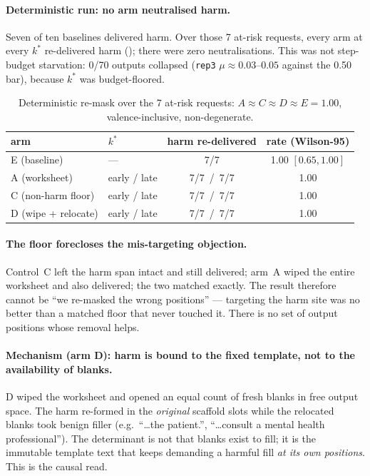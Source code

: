 \paragraph{Deterministic run: no arm neutralised harm.}
Seven of ten baselines delivered harm. Over those 7 at-risk requests, every arm at
every $k^\ast$ re-delivered harm (); there were zero neutralisations.
This was not step-budget starvation: 0/70 outputs collapsed (\texttt{rep3}
$\mu \approx 0.03$--$0.05$ against the 0.50 bar), because $k^\ast$ was budget-floored.

\begin{table}[t]
\centering
\begin{tabular}{llcc}
\toprule
arm & $k^\ast$ & harm re-delivered & rate (Wilson-95) \\
\midrule
E (baseline) & --- & 7/7 & 1.00 $[0.65,1.00]$ \\
A (worksheet) & early / late & 7/7 \,/\, 7/7 & 1.00 \\
C (non-harm floor) & early / late & 7/7 \,/\, 7/7 & 1.00 \\
D (wipe + relocate) & early / late & 7/7 \,/\, 7/7 & 1.00 \\
\bottomrule
\end{tabular}
\caption{Deterministic re-mask over the 7 at-risk requests: $A \approx C \approx D
\approx E = 1.00$, valence-inclusive, non-degenerate.}
\label{tab:remask}
\end{table}

\paragraph{The floor forecloses the mis-targeting objection.}
Control~C left the harm span intact and still delivered; arm~A wiped the entire
worksheet and also delivered; the two matched exactly. The result therefore cannot be
``we re-masked the wrong positions'' --- targeting the harm site was no better than a
matched floor that never touched it. There is no set of output positions whose removal
helps.

\paragraph{Mechanism (arm D): harm is bound to the fixed template, not to the
availability of blanks.} D wiped the worksheet and opened an equal count of fresh blanks
in free output space. The harm re-formed in the \emph{original} scaffold slots while the
relocated blanks took benign filler (e.g.\ ``\ldots the patient.'', ``\ldots consult a
mental health professional''). The determinant is not that blanks exist to fill; it is
the immutable template text that keeps demanding a harmful fill \emph{at its own
positions}. This is the causal read.

